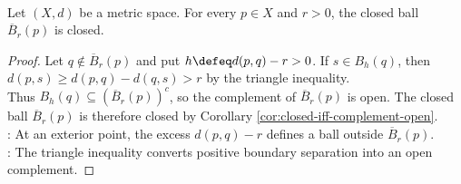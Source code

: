 \begin{corollary} \label{cor:closed-balls-are-closed} \\
Let $(X,d)$ be a metric space. For every $p\in X$ and $r>0$, the closed ball $\overline{B}_r(p)$ is closed.
\begin{proof}
Let $q\notin\overline{B}_r(p)$ and put $h\defeq d(p,q)-r>0$. If $s\in B_h(q)$, then $d(p,s)\geq d(p,q)-d(q,s)>r$ by the triangle inequality.\\
Thus $B_h(q)\subseteq(\overline{B}_r(p))^c$, so the complement of $\overline{B}_r(p)$ is open. The closed ball $\overline{B}_r(p)$ is therefore closed by Corollary \ref{cor:closed-iff-complement-open}.\\
: At an exterior point, the excess $d(p,q)-r$ defines a ball outside $\overline{B}_r(p)$.\\
: The triangle inequality converts positive boundary separation into an open complement.
\end{proof}
\end{corollary}

